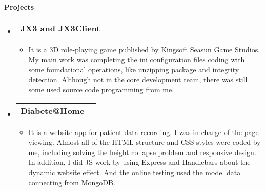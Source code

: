 \documentclass[letterpaper,12pt]{article}[leftmargin=*]
\makeatletter
\def \entryspacing {-0pt}
\renewcommand{\section}[2]{\vspace{5pt}
  \colorbox{secondary}{\color{white}\raggedbottom\normalsize\textbf{{#1}{\hspace{7pt}#2}}}
}
\newcommand{\resumeEntryStart}{\begin{itemize}[leftmargin=2.5mm]}
\newcommand{\resumeEntryEnd}{\end{itemize}\vspace{\entryspacing}}
\newcommand{\resumeItemListStart}{\begin{itemize}[leftmargin=4.5mm]}
\newcommand{\resumeItemListEnd}{\end{itemize}}
\newcommand{\resumeItem}[1]{
  \item\small{
    {#1 \vspace{-2pt}}
  }
}
\newcommand{\resumeEntryTD}[2]{
  \vspace{-1pt}\item[]
    \begin{tabularx}{0.97\textwidth}{X@{\hspace{60pt}}r}
      \textbf{\color{primary}#1} & {\firabook\color{accent}\small#2} \\
    \end{tabularx}\vspace{-6pt}
}
\makeatother
\begin{document}
\section{\faFlask}{Projects}

  \resumeEntryStart
    \resumeEntryTD
      {JX3 and JX3Client}{}
    \resumeItemListStart
      \resumeItem {It is a 3D role-playing game published by Kingsoft Seasun Game Studios. My main work was completing the ini configuration files coding with some foundational operations, like unzipping package and integrity detection. Although not in the core development team, there was still some used source code programming from me.}
    \resumeItemListEnd
  \resumeEntryEnd

  \resumeEntryStart
    \resumeEntryTD
      {Diabete@Home}{}
    \resumeItemListStart
      \resumeItem {It is a website app for patient data recording. I was in charge of the page viewing. Almost all of the HTML structure and CSS styles were coded by me, including solving the height collapse problem and responsive design. In addition, I did JS work by using Express and Handlebars about the dynamic website effect. And the online testing used the model data connecting from MongoDB.}
    \resumeItemListEnd
  \resumeEntryEnd
\end{document}
